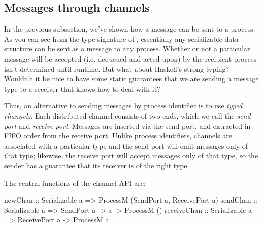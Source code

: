 \documentclass[preprint]{sigplanconf}
\begin{document}



\subsection{Messages through channels}
In the previous subsection, we've shown how a message can be sent to a process. As you can see from the type signature of , essentially any serializable data structure can be sent as a message to any process. Whether or not a particular message will be accepted (i.e. dequeued and acted upon) by the recipient process isn't determined until runtime. But what about Haskell's strong typing? Wouldn't it be nice to have some static guarantees that we are sending a message type to a receiver that knows how to deal with it?

Thus, an alternative to sending messages by process identifier is to use {\em typed channels}. Each distributed channel consists of two ends, which we call the {\em send port} and {\em receive port}. Messages are inserted via the send port, and extracted in FIFO order from the receive port. Unlike process identifiers, channels are associated with a particular type and the send port will emit messages only of that type; likewise, the receive port will accept messages only of that type, so the sender has a guarantee that its receiver is of the right type.

The central functions of the channel API are:
\par{\small
\begin{code}
newChan  :: Serializable a 
         => ProcessM (SendPort a, ReceivePort a)
sendChan :: Serializable a => SendPort a -> a -> ProcessM ()
receiveChan :: Serializable a => ReceivePort a -> ProcessM a
\end{code}}
\end{document}
